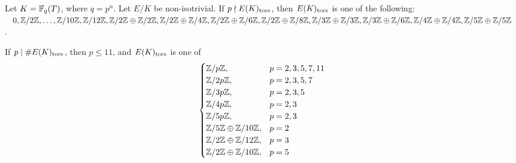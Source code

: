 \begin{frame}[plain]
\end{frame}



\begin{frame}[plain]
\begin{thm}[McDonald, 2017]
Let $K= \F_q(T)$, where $q=p^n$. Let $E/K$ be non-isotrivial. If $p \nmid E(K)_\tors$, then $E(K)_\tors$ is one of the following: $0,\Z/2\Z, \ldots,\Z/10\Z,\Z/12\Z, \Z/2\Z \oplus \Z/2\Z, \Z/2\Z \oplus \Z/4\Z, \Z/2\Z \oplus \Z/6\Z, \Z/2\Z \oplus \Z/8\Z, \Z/3\Z \oplus \Z/3\Z, \Z/3\Z \oplus \Z/6\Z, \Z/4\Z \oplus \Z/4\Z, \Z/5\Z \oplus \Z/5\Z$.

If $p \mid \#E(K)_\tors$, then $p \leq 11$, and $E(K)_\tors$ is one of
	\[
	\begin{cases}
	\Z/p\Z, & p=2,3,5,7,11 \\
	\Z/2p\Z, & p=2,3,5,7 \\
	\Z/3p\Z, & p=2,3,5 \\
	\Z/4p\Z, & p=2,3 \\
	\Z/5p\Z, & p=2,3 \\
	\Z/5\Z \oplus \Z/10\Z, & p=2 \\
	\Z/2\Z \oplus \Z/12\Z, & p=3 \\
	\Z/2\Z \oplus \Z/10\Z, & p=5
	\end{cases}
	\]
\end{thm}
\end{frame}


\begin{frame}[plain]
\end{frame}